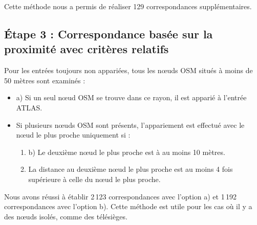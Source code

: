 Cette méthode nous a permis de réaliser 129 correspondances supplémentaires.

\subsection{Étape 3 : Correspondance basée sur la proximité avec critères relatifs}  
Pour les entrées toujours non appariées, tous les nœuds OSM situés à moins de 50 mètres sont examinés :  
\begin{itemize}  
    \item a) Si un seul nœud OSM se trouve dans ce rayon, il est apparié à l’entrée ATLAS.  
    \item Si plusieurs nœuds OSM sont présents, l’appariement est effectué avec le nœud le plus proche uniquement si :  
    \begin{enumerate}  
        \item b) Le deuxième nœud le plus proche est à au moins 10 mètres.  
        \item La distance au deuxième nœud le plus proche est au moins 4 fois supérieure à celle du nœud le plus proche.  
    \end{enumerate}  
\end{itemize}  
Nous avons réussi à établir 2\,123 correspondances avec l'option a) et 1\,192 correspondances avec l'option b).
Cette méthode est utile pour les cas où il y a des nœuds isolés, comme des télésièges.  

